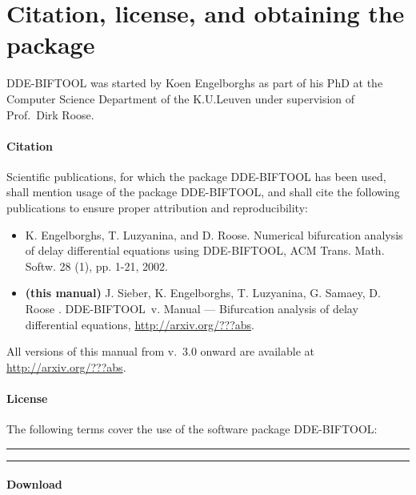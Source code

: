 \documentclass[10pt]{scrartcl}
\newcommand{\DDEBIFCODE}{\textsc{DDE-BIFTOOL}}
\begin{document}

%
%
\renewcommand{\contentsname}{}
\tableofcontents
\clearpage
{}
\section{Citation, license, and obtaining the package}
\label{sec:app:get}
{\DDEBIFCODE} %
was started by Koen Engelborghs as part of his PhD at
the Computer Science Department of the K.U.Leuven under supervision
of Prof.\ Dirk Roose.

\paragraph{Citation}
Scientific publications, for which the package DDE-BIFTOOL has been
used, shall mention usage of the package DDE-BIFTOOL, and shall cite
the following publications to ensure proper attribution and
reproducibility:
\begin{itemize}\item 
  K. Engelborghs, T. Luzyanina, and D. Roose. Numerical bifurcation
  analysis of delay differential equations using DDE-BIFTOOL, ACM
  Trans. Math. Softw. 28 (1), pp. 1-21, 2002.
\item\textbf{(this manual)} J. Sieber, K. Engelborghs, T. Luzyanina,
  G. Samaey, D. Roose . \DDEBIFCODE\ v. \version{} Manual ---
  Bifurcation analysis
          of delay differential equations, \url{http://arxiv.org/???abs}.
\end{itemize}
All versions of this manual from v.~3.0 onward are available at
\url{http://arxiv.org/???abs}.
\paragraph{License}
The following terms cover the use of the software package {\DDEBIFCODE}:
\bigskip\hrule
{\ttfamily
\begin{flushleft} {\parindent0pt
    \parskip5pt  }
\end{flushleft}
}
\hrule\bigskip

\paragraph{Download}
\end{document}
